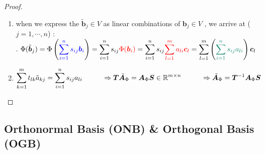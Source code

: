 \begin{enumerate}
\begin{proof}
\begin{enumerate}
    
            \item when we express the $\tilde{\bm{b}}_j \in V$ as linear combinations of $\bm{b}_j \in V$ , we arrive at ($j = 1,\cdots, n$) :
            \hfill \cite{mfml/book/mml/Deisenroth-Faisal-Ong}
            \\
            .\hfill
            $
                \Phi (\tilde{\bm{b}}_j ) 
                = \Phi  \dParenBrac{ \textcolor{blue}{\dsum ^n _{i=1} s_{ij} \bm{b}_i}}
                = \dsum ^n _{i=1} s_{ij} \textcolor{red}{\Phi (\bm{b}_i)} 
                = \dsum^n _{i=1} s_{ij} \textcolor{red}{\dsum ^m _{l=1} a_{li} \bm{c}_l}
                = \dsum ^m _{l=1} \dParenBrac{ \textcolor{PineGreen}{\dsum^n _{i=1} s_{ij} a_{li}} } \bm{c}_l
            $
            \hfill \cite{mfml/book/mml/Deisenroth-Faisal-Ong}
    
            \item $
                \begin{aligned}
                    \displaystyle\sum^m_{k=1} t_{lk} \tilde{a}_{kj} = \displaystyle\sum^n _{i=1} s_{ij} a_{li}
                    \hspace{1cm}
                    \Rightarrow 
                    \bm{T} \tilde{\bm{A}}_\Phi = \bm{A}_\Phi \bm{S} 
                    \in \mathbb{R}^{m\times n}
                    \hspace{1cm}
                    \Rightarrow 
                    \tilde{\bm{A}}_\Phi = \bm{T}^{-1} \bm{A}_\Phi \bm{S}
                \end{aligned}
            $
            \hfill \cite{mfml/book/mml/Deisenroth-Faisal-Ong}        
        \end{enumerate}
    \end{proof}

    
\end{enumerate}






\subsection{Orthonormal Basis (ONB) \& Orthogonal Basis (OGB)}


